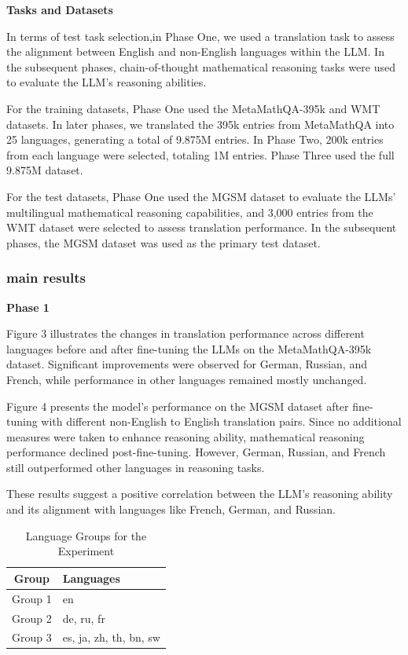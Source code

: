 \documentclass[11pt]{article}
\begin{document}
\textbf{Tasks and Datasets}

In terms of test task selection,in Phase One, we used a translation task to assess the alignment between English and non-English languages within the LLM. In the subsequent phases, chain-of-thought mathematical reasoning tasks were used to evaluate the LLM’s reasoning abilities.

For the training datasets, Phase One used the MetaMathQA-395k and WMT datasets. In later phases, we translated the 395k entries from MetaMathQA into 25 languages, generating a total of 9.875M entries. In Phase Two, 200k entries from each language were selected, totaling 1M entries. Phase Three used the full 9.875M dataset.

For the test datasets, Phase One used the MGSM dataset to evaluate the LLMs' multilingual mathematical reasoning capabilities, and 3,000 entries from the WMT dataset were selected to assess translation performance. In the subsequent phases, the MGSM dataset was used as the primary test dataset.


\subsubsection{main results}

\textbf{Phase 1}

Figure 3 illustrates the changes in translation performance across different languages before and after fine-tuning the LLMs on the MetaMathQA-395k dataset. Significant improvements were observed for German, Russian, and French, while performance in other languages remained mostly unchanged.

Figure 4 presents the model's performance on the MGSM dataset after fine-tuning with different non-English to English translation pairs. Since no additional measures were taken to enhance reasoning ability, mathematical reasoning performance declined post-fine-tuning. However, German, Russian, and French still outperformed other languages in reasoning tasks.

These results suggest a positive correlation between the LLM's reasoning ability and its alignment with languages like French, German, and Russian.

\begin{table}[h]
\centering
\caption{Language Groups for the Experiment}
\begin{tabular}{|c|l|}
\hline
\textbf{Group} & \textbf{Languages} \\ \hline
Group 1        & en                \\ \hline
Group 2        & de, ru, fr         \\ \hline
Group 3        & es, ja, zh, th, bn, sw \\ \hline
\end{tabular}
\end{table}
\end{document}
